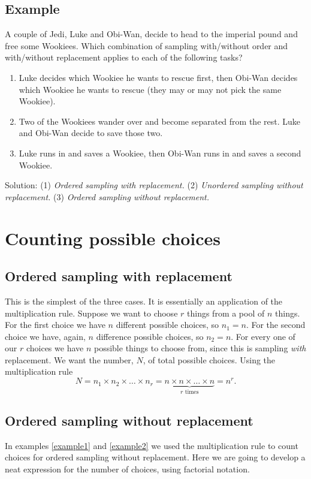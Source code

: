\subsection{Example}
A couple of Jedi, Luke and Obi-Wan, decide to head to the imperial pound and free some Wookiees. 
Which combination of sampling with/without order and with/without replacement applies to each of the following tasks?
\begin{enumerate}
\item
Luke decides which Wookiee he wants to rescue first, then Obi-Wan decides which Wookiee he wants to rescue (they may or may not pick the same Wookiee).
\item
Two of the Wookiees wander over and become separated from the rest. Luke and Obi-Wan decide to save those two.
\item
Luke runs in and saves a Wookiee, then Obi-Wan runs in and saves a second Wookiee.
\end{enumerate}
Solution: (1) \textit{Ordered sampling with replacement.} (2) \textit{Unordered sampling without replacement.} (3) \textit{Ordered sampling without replacement.}

\section{Counting possible choices}
\subsection{Ordered sampling with replacement}
This is the simplest of the three cases. It is essentially an application of the multiplication rule. Suppose we want to choose $r$ things from a pool of $n$ things. For the first choice we have $n$ different possible choices, so $n_1 = n$. For the second choice we have, again, $n$ difference possible choices, so $n_2 = n$. For every one of our $r$ choices we have $n$ possible things to choose from, since this is sampling \textit{with} replacement. We want the number, $N$, of total possible choices. Using the multiplication rule
\[
N = n_1 \times n_2 \times \ldots \times n_r = \underbrace{n \times n \times \ldots \times n}_{\text{$r$ times}} = n^r.
\]

\subsection{Ordered sampling without replacement}
In examples \ref{example1} and \ref{example2} we used the multiplication rule to count choices for ordered sampling without replacement. Here we are going to develop a neat expression for the number of choices, using factorial notation. \\

